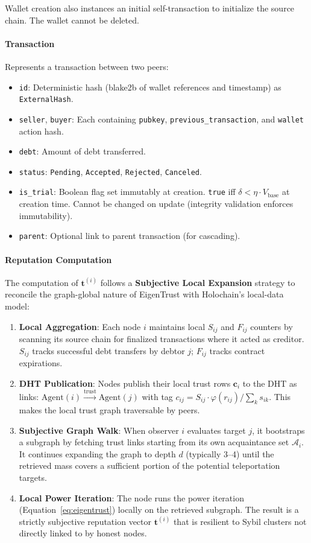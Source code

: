\documentclass[11pt]{article}
\begin{document}
Wallet creation also instances an initial self-transaction to initialize the source chain. The wallet cannot be deleted.

\paragraph{Transaction} Represents a transaction between two peers:
\begin{itemize}
    \item \texttt{id}: Deterministic hash (blake2b of wallet references and timestamp) as \texttt{ExternalHash}.
    \item \texttt{seller}, \texttt{buyer}: Each containing \texttt{pubkey}, \texttt{previous\_transaction}, and \texttt{wallet} action hash.
    \item \texttt{debt}: Amount of debt transferred.
    \item \texttt{status}: \texttt{Pending}, \texttt{Accepted}, \texttt{Rejected}, \texttt{Canceled}.
    \item \texttt{is\_trial}: Boolean flag set immutably at creation. \texttt{true} iff $\delta < \eta \cdot V_{\text{base}}$ at creation time. Cannot be changed on update (integrity validation enforces immutability).
    \item \texttt{parent}: Optional link to parent transaction (for cascading).
\end{itemize}

\paragraph{Reputation Computation}
The computation of $\mathbf{t}^{(i)}$ follows a \textbf{Subjective Local Expansion} strategy to reconcile the graph-global nature of EigenTrust with Holochain's local-data model:
\begin{enumerate}
    \item \textbf{Local Aggregation}: Each node $i$ maintains local $S_{ij}$ and $F_{ij}$ counters by scanning its source chain for finalized transactions where it acted as creditor. $S_{ij}$ tracks successful debt transfers by debtor $j$; $F_{ij}$ tracks contract expirations.
    \item \textbf{DHT Publication}: Nodes publish their local trust rows $\mathbf{c}_i$ to the DHT as links: $\text{Agent}(i) \xrightarrow{\text{trust}} \text{Agent}(j)$ with tag $c_{ij} = S_{ij} \cdot \varphi(r_{ij}) / \sum_k s_{ik}$. This makes the local trust graph traversable by peers.
    \item \textbf{Subjective Graph Walk}: When observer $i$ evaluates target $j$, it bootstraps a subgraph by fetching trust links starting from its own acquaintance set $\mathcal{A}_i$. It continues expanding the graph to depth $d$ (typically 3--4) until the retrieved mass covers a sufficient portion of the potential teleportation targets.
    \item \textbf{Local Power Iteration}: The node runs the power iteration (Equation~\ref{eq:eigentrust}) locally on the retrieved subgraph. The result is a strictly subjective reputation vector $\mathbf{t}^{(i)}$ that is resilient to Sybil clusters not directly linked to by honest nodes.
\end{enumerate}
\end{document}
